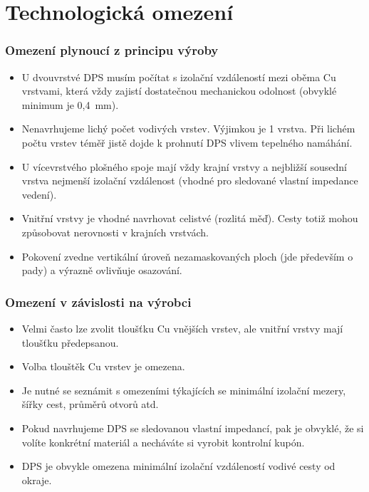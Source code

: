 \documentclass{beamer}
\begin{document}
\section{\texorpdfstring{Technologická omezení}{Technologicka omezeni}}
\begin{frame}
	\frametitle{Omezení plynoucí z principu výroby}

	\begin{itemize}
		\item U dvouvrstvé DPS musím počítat s izolační vzdáleností mezi oběma Cu vrstvami, která vždy zajistí dostatečnou mechanickou odolnost (obvyklé minimum je 0,4~mm).
		\item Nenavrhujeme lichý počet vodivých vrstev. Výjimkou je 1 vrstva. Při lichém počtu vrstev téměř jistě dojde k prohnutí DPS vlivem tepelného namáhání.
		\item U vícevrstvého plošného spoje mají vždy krajní vrstvy a nejbližší sousední vrstva nejmenší izolační vzdálenost (vhodné pro sledované vlastní impedance vedení).
		\item Vnitřní vrstvy je vhodné navrhovat celistvé (rozlitá měď). Cesty totiž mohou způsobovat nerovnosti v krajních vrstvách.
		\item Pokovení zvedne vertikální úroveň nezamaskovaných ploch (jde především o pady) a výrazně ovlivňuje osazování.
	\end{itemize}
\end{frame}
\begin{frame}
	\frametitle{Omezení v závislosti na výrobci}

	\begin{itemize}
		\item Velmi často lze zvolit tloušťku Cu vnějších vrstev, ale vnitřní vrstvy mají tloušťku předepsanou.
		\item Volba tlouštěk Cu vrstev je omezena.
		\item Je nutné se seznámit s omezeními týkajících se minimální izolační mezery, šířky cest, průměrů otvorů atd.
		\item Pokud navrhujeme DPS se sledovanou vlastní impedancí, pak je obvyklé, že si volíte konkrétní materiál a necháváte si vyrobit kontrolní kupón.
		\item DPS je obvykle omezena minimální izolační vzdáleností vodivé cesty od okraje.
	\end{itemize}
\end{frame}
\end{document}
